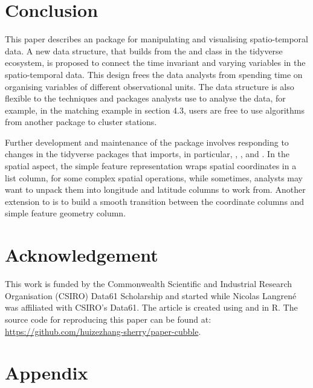 \documentclass[
]{jss}
\begin{document}
\hypertarget{conclude}{%
\section{Conclusion}\label{conclude}}

This paper describes an  package  for manipulating and visualising spatio-temporal data. A new data structure,  that builds from the  and  class in the tidyverse ecosystem, is proposed to connect the time invariant and varying variables in the spatio-temporal data. This design frees the data analysts from spending time on organising variables of different observational units. The data structure is also flexible to the techniques and packages analysts use to analyse the data, for example, in the matching example in section 4.3, users are free to use algorithms from another package to cluster stations.

Further development and maintenance of the package involves responding to changes in the tidyverse packages that  imports, in particular, , , and . In the spatial aspect, the simple feature representation wraps spatial coordinates in a list column, for some complex spatial operations, while sometimes, analysts may want to unpack them into longitude and latitude columns to work from. Another extension to  is to build a smooth transition between the coordinate columns and simple feature geometry column.

\newpage

\hypertarget{acknowledgement}{%
\section{Acknowledgement}\label{acknowledgement}}

This work is funded by the Commonwealth Scientific and Industrial Research Organisation (CSIRO) Data61 Scholarship and started while Nicolas Langrené was affiliated with CSIRO's Data61. The article is created using  \citep{knitr} and  \citep{rmarkdown} in R. The source code for reproducing this paper can be found at: \url{https://github.com/huizezhang-sherry/paper-cubble}.

\hypertarget{appendix}{%
\section{Appendix}\label{appendix}}
\end{document}
